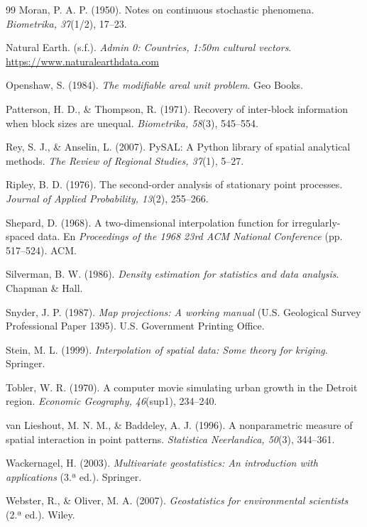 \documentclass[12pt,a4paper]{article}
\begin{document}
\begin{thebibliography}{99}
 Moran, P. A. P. (1950). Notes on continuous stochastic phenomena. \emph{Biometrika, 37}(1/2), 17--23.

 Natural Earth. (s.f.). \emph{Admin 0: Countries, 1:50m cultural vectors}. \url{https://www.naturalearthdata.com}

 Openshaw, S. (1984). \emph{The modifiable areal unit problem}. Geo Books.

 Patterson, H. D., \& Thompson, R. (1971). Recovery of inter-block information when block sizes are unequal. \emph{Biometrika, 58}(3), 545--554.

 Rey, S. J., \& Anselin, L. (2007). PySAL: A Python library of spatial analytical methods. \emph{The Review of Regional Studies, 37}(1), 5--27.

 Ripley, B. D. (1976). The second-order analysis of stationary point processes. \emph{Journal of Applied Probability, 13}(2), 255--266.

 Shepard, D. (1968). A two-dimensional interpolation function for irregularly-spaced data. En \emph{Proceedings of the 1968 23rd ACM National Conference} (pp. 517--524). ACM.

 Silverman, B. W. (1986). \emph{Density estimation for statistics and data analysis}. Chapman \& Hall.

 Snyder, J. P. (1987). \emph{Map projections: A working manual} (U.S. Geological Survey Professional Paper 1395). U.S. Government Printing Office.

 Stein, M. L. (1999). \emph{Interpolation of spatial data: Some theory for kriging}. Springer.

 Tobler, W. R. (1970). A computer movie simulating urban growth in the Detroit region. \emph{Economic Geography, 46}(sup1), 234--240.

 van Lieshout, M. N. M., \& Baddeley, A. J. (1996). A nonparametric measure of spatial interaction in point patterns. \emph{Statistica Neerlandica, 50}(3), 344--361.

 Wackernagel, H. (2003). \emph{Multivariate geostatistics: An introduction with applications} (3.ª ed.). Springer.

 Webster, R., \& Oliver, M. A. (2007). \emph{Geostatistics for environmental scientists} (2.ª ed.). Wiley.

\end{thebibliography}
\end{document}
